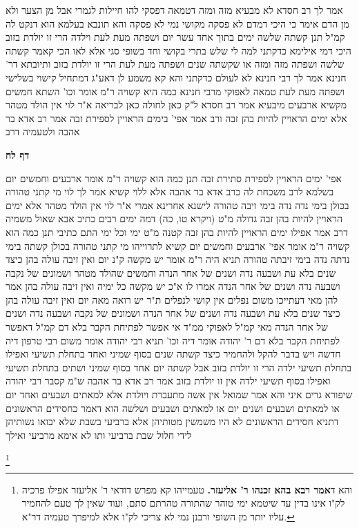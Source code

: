 \documentclass[12pt, openany]{book}
\newcommand{\sethebfont}{
\fontsize{10.5pt}{21.0pt} \selectfont
}
\newcommand{\twocol}[1]{
	{\sethebfont \begin{multicols}{2}
			#1
	\end{multicols}}	
}
\newcommand{\sectname}{}
\newcommand{\newsection}[1]{
	\addcontentsline{toc}{section}{#1}
	\renewcommand{\sectname}{#1}	
	\vspace{-\baselineskip}
	\begin{center}
		\textbf{%
\fontsize{16pt}{16pt}\selectfont
			#1}
	\end{center}
	\vspace{-\baselineskip}
	\nopagebreak
}
\newcommand{\footnotecomment}[1]{
	\renewcommand\thefootnote{}
	\footnote{#1}}
\newcommand{\commenta}[1]{\footnotecomment{#1}}
\begin{document}
{אמר לך רב חסדא לא מבעיא מזה ומזה דטמאה דפסקי להו חיילות לגמרי אבל מן הצער ולא מן הדם אימר כי היכי דמדם לא פסקה מקושי נמי לא פסקה והא תונבא בעלמא הוא דנקט לה קמ"ל 
תנן קשתה שלשה ימים בתוך אחד עשר יום ושפתה מעת לעת וילדה הרי זו יולדת בזוב 
היכי דמי אילימא כדקתני למה לי שלש בתרי בקושי וחד בשופי סגי 
אלא לאו הכי קאמר קשתה שלשה ושפתה מזה ומזה או שקשתה שנים ושפתה מעת לעת הרי זו יולדת בזוב ותיובתא דר' חנינא 
אמר לך רבי חנינא לא לעולם כדקתני והא קא משמע לן דאע"ג דמתחיל קישוי בשלישי ושפתה מעת לעת טמאה לאפוקי מרבי חנינא
כמה היא קשויה ר"מ אומר וכו' השתא חמשים מקשיא ארבעים מיבעיא אמר רב חסדא ל"ק כאן לחולה כאן לבריאה 
א"ר לוי אין הולד מטהר אלא ימים הראויין להיות בהן זבה ורב אמר אפי' בימים הראויין לספירת זבה אמר רב אדא בר אהבה ולטעמיה דרב}

\newsection{דף לח}
\twocol{אפי' ימים הראויין לספירת סתירת זבה 
תנן כמה הוא קשויה ר"מ אומר ארבעים וחמשים יום 
בשלמא לרב משכחת לה כרב אדא בר אהבה אלא ללוי קשיא
אמר לך לוי מי קתני טהורה בכולן בימי נדה נדה בימי זיבה טהורה 
לישנא אחרינא אמרי א"ר לוי אין הולד מטהר אלא ימים הראויין להיות בהן זבה גדולה מ"ט (ויקרא טו, כה) דמה ימים רבים כתיב 
אבא שאול משמיה דרב אמר אפילו ימים הראויין להיות בהן זבה קטנה מ"ט ימי וכל ימי התם כתיבי 
תנן כמה הוא קשויה ר"מ אומר אפי' ארבעים וחמשים יום קשיא לתרוייהו מי קתני טהורה בכולן קשתה בימי נדתה נדה בימי זיבתה טהורה 
תניא היה ר"מ אומר יש מקשה ק"נ יום ואין זיבה עולה בהן כיצד שנים בלא עת
ושבעה נדה ושנים של אחר הנדה וחמשים שהולד מטהר
ושמונים של נקבה ושבעה נדה ושנים של אחר הנדה 
אמרו לו א"כ יש מקשה כל ימיה ואין זיבה עולה בהן 
אמר להן מאי דעתייכו משום נפלים אין קושי לנפלים 
ת"ר יש רואה מאה יום ואין זיבה עולה בהן כיצד שנים בלא עת ושבעה נדה ושנים של אחר הנדה ושמונים של נקבה ושבעה נדה ושנים של אחר הנדה 
מאי קמ"ל לאפוקי ממ"ד אי אפשר לפתיחת הקבר בלא דם קמ"ל דאפשר לפתיחת הקבר בלא דם
ר' יהודה אומר דיה וכו' תניא רבי יהודה אומר משום רבי טרפון דיה חדשה ויש בדבר להקל ולהחמיר 
כיצד קשתה שנים בסוף שמיני ואחד בתחלת תשיעי ואפילו בתחלת תשיעי ילדה הרי זו יולדת בזוב
אבל קשתה יום אחד בסוף שמיני ושתים בתחלת תשיעי ואפילו בסוף תשיעי ילדה אין זו יולדת בזוב 
אמר רב אדא בר אהבה ש"מ קסבר רבי יהודה שיפורא גרים איני והא אמר שמואל אין אשה מתעברת ויולדת אלא למאתים ושבעים ואחד יום או למאתים ושבעים ושנים יום או למאתים ושבעים ושלשה 
הוא דאמר כחסידים הראשונים דתניא חסידים הראשונים לא היו משמשין מטותיהן אלא ברביעי בשבת שלא יבואו נשותיהן
לידי חלול שבת ברביעי ותו לא אימא מרביעי ואילך 
\commenta{ והא ד\textbf{אמר רבא בהא זכנהו ר' אליעזר.} טעמייהו קא מפרש דודאי ר' אליעזר אפילו פרכיה לק"ו אינו בדין עד שיטמא ימי טוהר שהתורה טהרתם סתם, ועוד שאין לך טעם להחמיר עליו יותר מן השופי ורבנן נמי לא צריכי לק"ו אלא למיפרך טעמיה דר"א. }
}
\end{document}
